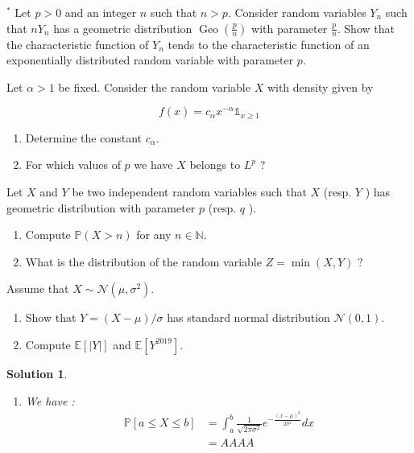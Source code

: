 \documentclass{article}
\newcommand{\proba}[1]{\mathbb{P}[#1]}
\newtheorem{solution}{Solution}
\begin{document}
\begin{Exercise} ${ }^{*}$ Let $p>0$ and an integer $n$ such that $n>p$. Consider random variables $Y_{n}$ such that $n Y_{n}$ has a geometric distribution $\operatorname{Geo}\left(\frac{p}{n}\right)$ with parameter $\frac{p}{n}$. Show that the characteristic function of $Y_{n}$ tends to the characteristic function of an exponentially distributed random variable with parameter $p$.

\end{Exercise}

\begin{Exercise} Let $\alpha>1$ be fixed. Consider the random variable $X$ with density given by

  $$
    f(x)=c_{\alpha} x^{-\alpha} \mathbb{1}_{x \geq 1}
  $$

  \begin{enumerate}
    \item Determine the constant $c_{\alpha}$.

    \item For which values of $p$ we have $X$ belongs to $L^{p}$ ?

  \end{enumerate}
\end{Exercise}

\begin{Exercise} Let $X$ and $Y$ be two independent random variables such that $X$ (resp. $Y$ ) has geometric distribution with parameter $p$ (resp. $q$ ).
  \begin{enumerate}
    \item Compute $\mathbb{P}(X>n)$ for any $n \in \mathbb{N}$.
    \item What is the distribution of the random variable $Z=\min (X, Y)$ ?
  \end{enumerate}
\end{Exercise}

\begin{Exercise} Assume that $X \sim \mathcal{N}\left(\mu, \sigma^{2}\right)$.
  \begin{enumerate}
    \item Show that $Y=(X-\mu) / \sigma$ has standard normal distribution
          $\mathcal{N}(0,1)$.
    \item Compute $\mathbb{E}[|Y|]$ and $\mathbb{E}\left[Y^{2019}\right]$.
  \end{enumerate}
\end{Exercise}

\begin{solution}
  \begin{enumerate}
    \item We have :
          \begin{align*}
            \proba{a \leq X \leq b} & = \int_a^b \frac{1}{\sqrt{2\pi \sigma^2}} e^{-\frac{(x-\mu)^2}{2\sigma^2}} dx \\
                                    & = AAAA
          \end{align*}
  \end{enumerate}
\end{solution}
\end{document}
